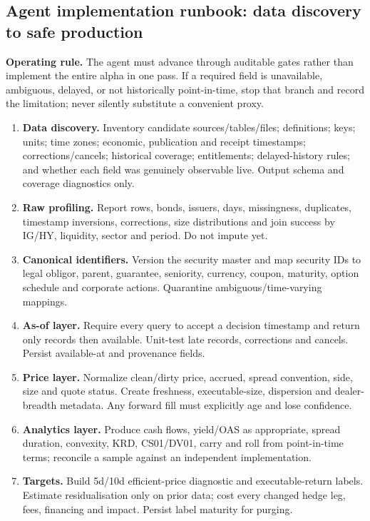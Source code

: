 \documentclass[10pt]{article}
\begin{document}
\subsection{Agent implementation runbook: data discovery to safe production}
\textbf{Operating rule.} The agent must advance through auditable gates rather than implement the entire alpha in one pass. If a required field is unavailable, ambiguous, delayed, or not historically point-in-time, stop that branch and record the limitation; never silently substitute a convenient proxy.
\begin{enumerate}[leftmargin=2em,label=\textbf{A\arabic*.}]
\item \textbf{Data discovery.} Inventory candidate sources/tables/files; definitions; keys; units; time zones; economic, publication and receipt timestamps; corrections/cancels; historical coverage; entitlements; delayed-history rules; and whether each field was genuinely observable live. Output schema and coverage diagnostics only.
\item \textbf{Raw profiling.} Report rows, bonds, issuers, days, missingness, duplicates, timestamp inversions, corrections, size distributions and join success by IG/HY, liquidity, sector and period. Do not impute yet.
\item \textbf{Canonical identifiers.} Version the security master and map security IDs to legal obligor, parent, guarantee, seniority, currency, coupon, maturity, option schedule and corporate actions. Quarantine ambiguous/time-varying mappings.
\item \textbf{As-of layer.} Require every query to accept a decision timestamp and return only records then available. Unit-test late records, corrections and cancels. Persist available-at and provenance fields.
\item \textbf{Price layer.} Normalize clean/dirty price, accrued, spread convention, side, size and quote status. Create freshness, executable-size, dispersion and dealer-breadth metadata. Any forward fill must explicitly age and lose confidence.
\item \textbf{Analytics layer.} Produce cash flows, yield/OAS as appropriate, spread duration, convexity, KRD, CS01/DV01, carry and roll from point-in-time terms; reconcile a sample against an independent implementation.
\item \textbf{Targets.} Build 5d/10d efficient-price diagnostic and executable-return labels. Estimate residualisation only on prior data; cost every changed hedge leg, fees, financing and impact. Persist label maturity for purging.

\end{enumerate}
\end{document}
